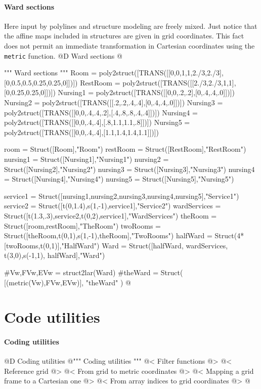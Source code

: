 \documentclass[11pt,oneside]{article}    %
\begin{document}
\paragraph{Ward sections}
Here input by polylines and structure modeling are freely mixed. Just notice that
the affine maps included in structures are given in grid coordinates. This fact 
does not permit an immediate transformation in Cartesian coordinates using the \texttt{metric}
function.
@D Ward sections
@{""" Ward sections """
Room = poly2struct([TRANS([[0,0,1,1,2./3,2./3],[0,0.5,0.5,0.25,0.25,0]])])
RestRoom = poly2struct([TRANS([[2./3,2./3,1,1],[0,0.25,0.25,0]])])
Nursing1 = poly2struct([TRANS([[0,0,.2,.2],[0,.4,.4,.0]])])
Nursing2 = poly2struct([TRANS([[.2,.2,.4,.4],[0,.4,.4,.0]])])
Nursing3 = poly2struct([TRANS([[0,0,.4,.4,.2],[.4,.8,.8,.4,.4]])])
Nursing4 = poly2struct([TRANS([[0,0,.4,.4],[.8,1.1,1.1,.8]])])
Nursing5 = poly2struct([TRANS([[0,0,.4,.4],[1.1,1.4,1.4,1.1]])])

room = Struct([Room],"Room")
restRoom = Struct([RestRoom],"RestRoom")
nursing1 = Struct([Nursing1],"Nursing1")
nursing2 = Struct([Nursing2],"Nursing2")
nursing3 = Struct([Nursing3],"Nursing3")
nursing4 = Struct([Nursing4],"Nursing4")
nursing5 = Struct([Nursing5],"Nursing5")

service1 = Struct([nursing1,nursing2,nursing3,nursing4,nursing5],"Service1")
service2 = Struct([t(0,1.4),s(1,-1),service1],"Service2")
wardServices = Struct([t(1.3,.3),service2,t(0,2),service1],"WardServices")
theRoom = Struct([room,restRoom],"TheRoom")
twoRooms =  Struct([theRoom,t(0,1),s(1,-1),theRoom],"TwoRooms")
halfWard = Struct(4*[twoRooms,t(0,1)],"HalfWard")
Ward = Struct([halfWard, wardServices, t(3,0),s(-1,1), halfWard],"Ward")

#Vw,FVw,EVw = struct2lar(Ward)
#theWard = Struct( [(metric(Vw),FVw,EVw)], "theWard" )
@}


\appendix
\section{Code utilities}

\paragraph{Coding utilities}
@D Coding utilities
@{""" Coding utilities """
@< Filter functions @>
@< Reference grid @>
@< From grid to metric coordinates @>
@< Mapping a grid frame to a Cartesian one @>
@< From array indices to grid coordinates @>
@}
\end{document}
